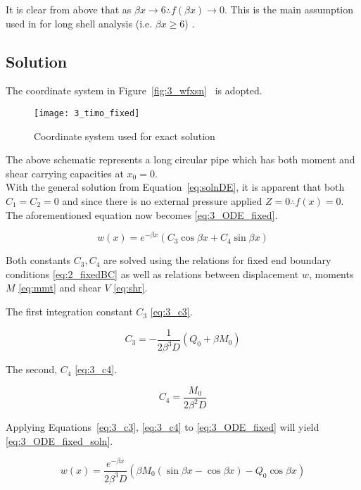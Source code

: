 It is clear from above that as $\beta x \rightarrow 6 \therefore f(\beta x) \rightarrow 0$. This is the main assumption used in for long shell analysis (i.e. $\beta x \geq 6$) \cite{roarks}.

\subsection{Solution}

The coordinate system in Figure~\ref{fig:3_wfxsn}~\cite{timoshenko1959theory} is adopted.
\begin{figure}[H]
	\centering
	\texttt{[image: 3\_timo\_fixed]}
	\caption{Coordinate system used for exact solution}
	\label{fig:CoordSyst}
\end{figure}

The above schematic represents a long circular pipe which has both moment and shear carrying capacities at $x_0=0$.\\

With the general solution from Equation~\ref{eq:solnDE}, it is apparent that both $C_1=C_2=0$ and since there is no external pressure applied $Z=0 \therefore f(x) = 0$. The aforementioned equation now becomes \ref{eq:3_ODE_fixed}.

\begin{equation}
	\label{eq:3_ODE_fixed}
	w(x)=e^{-\beta x} \left(C_3 \cos \beta x +C_4 \sin \beta x \right)
\end{equation}


Both constants $C_3, C_4$ are solved using the relations for fixed end boundary conditions \ref{eq:2_fixedBC} as well as relations between displacement $w$, moments $M$ \ref{eq:mmt} and shear $V$ \ref{eq:shr}.


The first integration constant $C_3$ \ref{eq:3_c3}.

\begin{equation}
	\label{eq:3_c3}
	C_3 = - \frac{1}{2 \beta^3 D} \left( Q_0 + \beta M_0 \right)
\end{equation}

The second, $C_4$ \ref{eq:3_c4}.

\begin{equation}
	\label{eq:3_c4}
	C_4 = \frac{M_0}{2 \beta^2 D}
\end{equation}


Applying Equations~\ref{eq:3_c3}, \ref{eq:3_c4} to \ref{eq:3_ODE_fixed} will yield \ref{eq:3_ODE_fixed_soln}.

\begin{equation}
	\label{eq:3_ODE_fixed_soln}
	w(x)= \frac{e^{-\beta x}}{2 \beta^3 D} \left( \beta M_0 (\sin \beta x -\cos \beta x) - Q_0 \cos \beta x  \right)
\end{equation}

